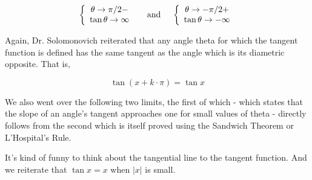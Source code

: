 \documentclass{article}
\begin{document}
\[\left\{\begin{array}{cc}\theta\to\pi/2-\\\tan\theta\to\infty\end{array}\right.\quad\textnormal{ and }\quad\left\{\begin{array}{cc}\theta\to-\pi/2+\\\tan\theta\to-\infty\end{array}\right.\]

Again, Dr. Solomonovich reiterated that any angle theta for which the tangent function is defined has the same tangent as the angle which is its diametric opposite. That is,

\[\tan(x+k\cdot\pi)=\tan x\]

\vspace{10pt}

We also went over the following two limits, the first of which - which states that the slope of an angle's tangent approaches one for small values of theta - directly follows from the second which is itself proved using the Sandwich Theorem or L'Hospital's Rule.

\vspace{10pt}

\begin{center}
\end{center}

\vspace{10pt}

It's kind of funny to think about the tangential line to the tangent function. And we reiterate that $\tan x=x$ when $|x|$ is small.

\vspace{10pt}

\begin{center}
\end{center}
\end{document}
